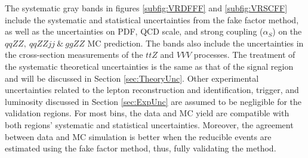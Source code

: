 The systematic gray bands in figures \ref{subfig:VRDFFF} and \ref{subfig:VRSCFF} include the systematic and statistical uncertainties from the fake factor method, as well as the uncertainties on PDF, QCD scale, and strong coupling ($\alpha_{S}$) on the $qqZZ,~qqZZjj~\&~ggZZ$ MC prediction. The bands also include the uncertainties in the cross-section measurements of the $ttZ$ and $VVV$ processes. The treatment of the systematic theoretical uncertainties is the same as that of the signal region and will be discussed in Section \ref{sec:TheoryUnc}. Other experimental uncertainties related to the lepton reconstruction and identification, trigger, and luminosity discussed in Section \ref{sec:ExpUnc} are assumed to be negligible for the validation regions. For most bins, the data and MC yield are compatible with both regions' systematic and statistical uncertainties. Moreover, the agreement between data and MC simulation is better when the reducible events are estimated using the fake factor method, thus, fully validating the method.

